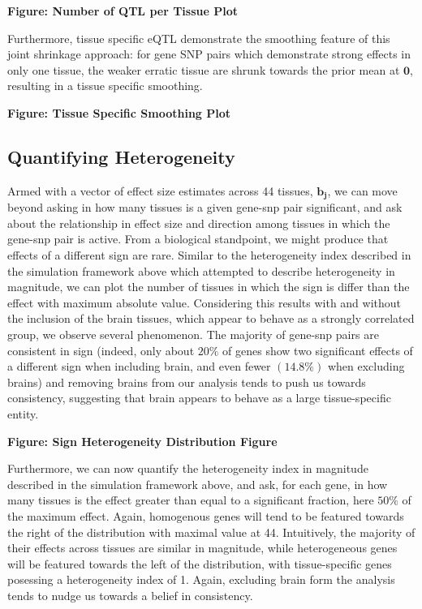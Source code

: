 \textbf{Figure: Number of QTL per Tissue Plot}
\newline

Furthermore, tissue specific eQTL demonstrate the smoothing feature of this joint shrinkage approach: for gene SNP pairs which demonstrate strong effects in only one tissue, the weaker erratic tissue are shrunk towards the prior mean at $\bm{0}$, resulting in a tissue specific smoothing.\newline


\textbf{Figure: Tissue Specific Smoothing Plot}
\newline

\subsection{Quantifying Heterogeneity}


Armed with a vector of effect size estimates across 44 tissues, $\bm{b_{j}}$, we can move beyond asking in how many tissues is a given gene-snp pair significant, and ask about the relationship in effect size and direction among tissues in which the gene-snp pair is active. From a biological standpoint, we might produce that effects of a different sign are rare. Similar to the heterogeneity index described in the simulation framework above which attempted to describe heterogeneity in magnitude, we can plot the number of tissues in which the sign is differ than the effect with maximum absolute value. Considering this results with and without the inclusion of the brain tissues, which appear to behave as a strongly correlated group, we observe several phenomenon. The majority of gene-snp pairs are consistent in sign (indeed, only about $20\%$ of genes show two significant effects of a different sign when including brain, and even fewer $(14.8\%)$ when excluding brains) and removing brains from our analysis tends to push us towards consistency, suggesting that brain appears to behave as a large tissue-specific entity.\newline


\textbf{Figure: Sign Heterogeneity Distribution Figure}
\newline

Furthermore, we can now quantify the heterogeneity index in magnitude described in the simulation framework above, and ask, for each gene, in how many tissues is the effect greater than equal to a significant fraction, here $50\%$ of the maximum effect. Again, homogenous genes will tend to be featured towards the right of the distribution with maximal value at 44. Intuitively, the majority of their effects across tissues are similar in magnitude, while heterogeneous genes will be featured towards the left of the distribution, with tissue-specific genes posessing a heterogeneity index of 1. Again, excluding brain form the analysis tends to nudge us towards a belief in consistency. 


